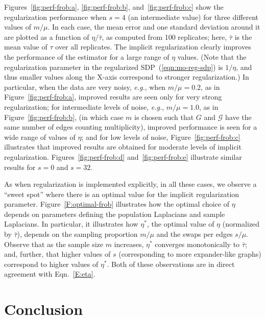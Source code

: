 \documentclass[12pt]{article}
\theoremstyle{plain}
\begin{document}
Figures~\ref{fig:perf-frob:a}, \ref{fig:perf-frob:b}, 
and~\ref{fig:perf-frob:c} show the regularization performance when $s=4$
(an intermediate value) for three different values of $m/\mu$.
In each case, the mean error and one standard deviation around it are 
plotted as a function of $\eta/\bar \tau$, as computed from 100 replicates;  
here, $\bar \tau$ is the mean value of $\tau$ over all replicates.
The implicit regularization clearly improves the performance of the 
estimator for a large range of $\eta$ values.  
(Note that the regularization parameter in the regularized 
SDP~(\ref{eqn:mo-reg-sdp}) is $1/\eta$, and thus smaller values along the
X-axis correspond to stronger regularization.)
In particular, when the data are very noisy, \emph{e.g.}, when $m/\mu=0.2$, 
as in Figure~\ref{fig:perf-frob:a}, improved results are seen only for very 
strong regularization;
for intermediate levels of noise, \emph{e.g.},  $m/\mu=1.0$, as in 
Figure~\ref{fig:perf-frob:b}, (in which case $m$ is chosen such that $G$ 
and $\mathcal{G}$ have the same number of edges counting multiplicity), 
improved performance is seen for a wide range of values of $\eta$; and for 
low levels of noise, Figure~\ref{fig:perf-frob:c} illustrates that improved 
results are obtained for moderate levels of implicit regularization.
Figures~\ref{fig:perf-frob:d} and~\ref{fig:perf-frob:e} illustrate similar
results for $s=0$ 
and 
$s=32$. 

As when regularization is implemented explicitly, in all these cases, we 
observe a ``sweet spot'' where there is an optimal value for the implicit 
regularization parameter.
Figure~\ref{F:optimal-frob} illustrates how the optimal choice of $\eta$ 
depends on parameters defining the population Laplacians and sample 
Laplacians.
In particular, it illustrates how $\eta^\ast$, the optimal value of 
$\eta$ (normalized by $\bar \tau$), depends on the sampling proportion 
$m / \mu$ and the swaps per edges $s / \mu$.
Observe that as the sample size $m$ increases, $\eta^\ast$ converges
monotonically to $\bar \tau$; and, further, that higher values of $s$ 
(corresponding to more expander-like graphs) correspond to higher values 
of $\eta^\ast$.
Both of these observations are in direct agreement with Eqn.~\eqref{E:eta}.


\vspace{-2mm}
\section{Conclusion}
\label{sxn:conc}
\vspace{-1mm}
\end{document}
